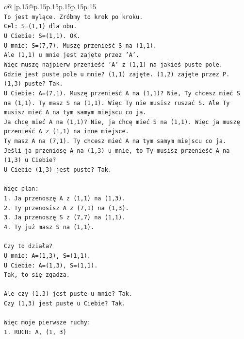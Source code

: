 \documentclass{article}
\begin{document}
{\begin{supertabular}{c@{$\;$}|p{.15\linewidth}@{}p{.15\linewidth}p{.15\linewidth}p{.15\linewidth}p{.15\linewidth}p{.15\linewidth}}
{{{\\ 
\texttt{To jest mylące. Zróbmy to krok po kroku.} \\
\texttt{Cel: S=(1,1) dla obu.} \\
\texttt{U Ciebie: S=(1,1). OK.} \\
\texttt{U mnie: S=(7,7). Muszę przenieść S na (1,1).} \\
\texttt{Ale (1,1) u mnie jest zajęte przez 'A'.} \\
\texttt{Więc muszę najpierw przenieść 'A' z (1,1) na jakieś puste pole.} \\
\texttt{Gdzie jest puste pole u mnie? (1,1) zajęte. (1,2) zajęte przez P. (1,3) puste? Tak.} \\
\texttt{U Ciebie: A=(7,1). Muszę przenieść A na (1,1)? Nie, Ty chcesz mieć S na (1,1). Ty masz S na (1,1). Więc Ty nie musisz ruszać S. Ale Ty musisz mieć A na tym samym miejscu co ja.} \\
\texttt{Ja chcę mieć A na (1,1)? Nie, ja chcę mieć S na (1,1). Więc ja muszę przenieść A z (1,1) na inne miejsce.} \\
\texttt{Ty masz A na (7,1). Ty chcesz mieć A na tym samym miejscu co ja.} \\
\texttt{Jeśli ja przeniosę A na (1,3) u mnie, to Ty musisz przenieść A na (1,3) u Ciebie?} \\
\texttt{U Ciebie (1,3) jest puste? Tak.} \\
\\ 
\texttt{Więc plan:} \\
\texttt{1. Ja przenoszę A z (1,1) na (1,3).} \\
\texttt{2. Ty przenosisz A z (7,1) na (1,3).} \\
\texttt{3. Ja przenoszę S z (7,7) na (1,1).} \\
\texttt{4. Ty już masz S na (1,1).} \\
\\ 
\texttt{Czy to działa?} \\
\texttt{U mnie: A=(1,3), S=(1,1).} \\
\texttt{U Ciebie: A=(1,3), S=(1,1).} \\
\texttt{Tak, to się zgadza.} \\
\\ 
\texttt{Ale czy (1,3) jest puste u mnie? Tak.} \\
\texttt{Czy (1,3) jest puste u Ciebie? Tak.} \\
\\ 
\texttt{Więc moje pierwsze ruchy:} \\
\texttt{1. RUCH: A, (1, 3)} \\
}}}
\end{supertabular}}
\end{document}
